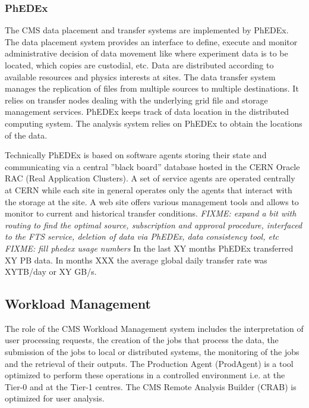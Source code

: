 \subsubsection{PhEDEx}
\label{sec:3_1_3}
The CMS data placement and transfer systems are implemented by PhEDEx\cite{RefPhEDEx}. The data placement system provides an interface to define, execute and monitor administrative decision of data movement like where experiment data is to be located, which copies are custodial, etc. 
Data are distributed according to available resources and physics interests at sites. 
The data transfer system manages the replication of files from multiple sources to multiple destinations. It relies on transfer nodes dealing with %
the underlying grid file and storage management services.
PhEDEx keeps track of data location in the distributed computing system. The analysis system relies on PhEDEx to obtain the locations of the data.

Technically PhEDEx is based on software agents storing their state and communicating via a central ''black board'' database hosted in the CERN Oracle RAC (Real Application Clusters). A set of service agents are operated centrally at CERN while each site in general operates only the agents that interact with the storage at the site. A web site offers various management tools and allows to monitor to current and historical transfer conditions.
\emph{FIXME: expand a bit with routing to find the optimal source, subscription and approval procedure, interfaced to the FTS service, deletion of data via PhEDEx, data consistency tool, etc}
\emph{FIXME: fill phedex usage numbers} In the last XY months PhEDEx transferred XY PB data. In months XXX the average global daily transfer rate was XYTB/day or XY GB/s. 

\subsection{Workload Management}
The role of the CMS Workload Management system includes the interpretation of
user processing requests, the creation of the jobs that process the data, the
submission of the jobs to local or distributed systems, the monitoring of the
jobs and the retrieval of their outputs. The Production Agent (ProdAgent)\cite{RefPA} is a tool
optimized to perform these operations in a controlled environment i.e. at the
Tier-0 and at the Tier-1 centres. The CMS Remote Analysis Builder (CRAB) is
optimized for user analysis.
%
\label{sec:3_2}

